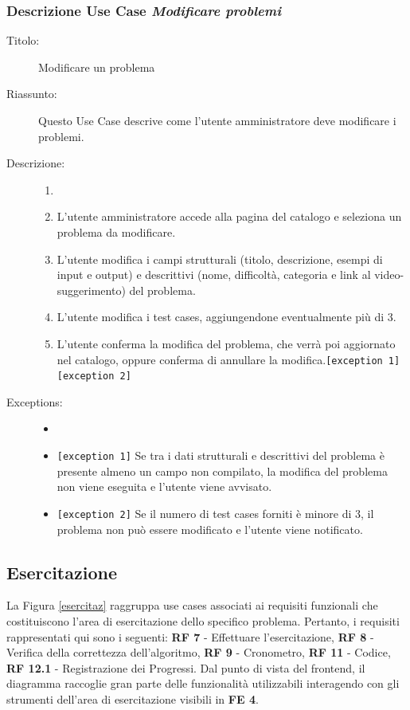 \documentclass[11pt, a4paper]{article}
\theoremstyle{definition} %
\begin{document}
\subsubsection*{Descrizione Use Case \textit{Modificare problemi}}
\begin{description}
    \item[Titolo:] Modificare un problema
    
    \item[Riassunto:] Questo Use Case descrive come l'utente amministratore
    deve modificare i problemi.

    \item[Descrizione:]
    \begin{enumerate}
        \item[]
        \item L'utente amministratore accede alla pagina del catalogo e seleziona un problema da modificare.
        \item L'utente modifica i campi strutturali (titolo, descrizione, esempi di input e output) e descrittivi (nome, difficoltà, categoria e link al video-suggerimento) del problema.
        \item L'utente modifica i test cases, aggiungendone eventualmente più di 3.
        \item L'utente conferma la modifica del problema, che verrà poi aggiornato nel catalogo, oppure conferma di annullare la modifica.\texttt{[exception 1]} \texttt{[exception 2]}
    \end{enumerate}
    
    \item[Exceptions:]
    \begin{itemize}
        \item[]
        \item \texttt{[exception 1]} Se tra i dati strutturali e descrittivi del problema è presente almeno un campo non compilato, la modifica del problema non viene eseguita e l'utente viene avvisato.
        \item \texttt{[exception 2]} Se il numero di test cases forniti è minore di 3, il problema non può essere modificato e l'utente viene notificato.
    \end{itemize}
\end{description}

\newpage
\subsection{Esercitazione}
La Figura \ref{esercitaz} raggruppa use cases associati ai requisiti funzionali
che costituiscono l'area di esercitazione dello specifico problema. Pertanto,
i requisiti rappresentati qui sono i seguenti: \textbf{RF 7} - Effettuare l'esercitazione,
\textbf{RF 8} - Verifica della correttezza dell'algoritmo, \textbf{RF 9} - Cronometro,
\textbf{RF 11} - Codice, \textbf{RF 12.1} - Registrazione dei Progressi. Dal punto di
vista del frontend, il diagramma raccoglie gran parte delle funzionalità utilizzabili
interagendo con gli strumenti dell'area di esercitazione visibili in \textbf{FE 4}.
\end{document}
